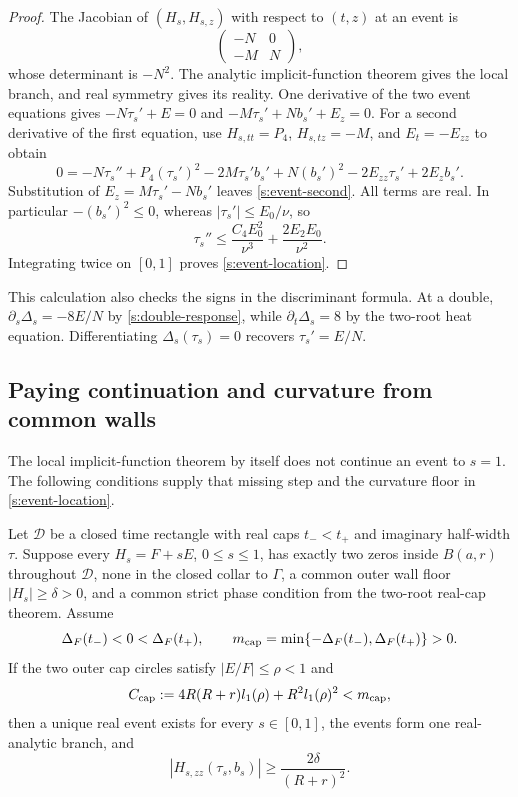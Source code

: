 \begin{proof}
The Jacobian of $(H_s,H_{s,z})$ with respect to $(t,z)$ at an event is
\[
 \begin{pmatrix}-N&0\\-M&N\end{pmatrix},
\]
whose determinant is $-N^2$.  The analytic implicit-function theorem
gives the local branch, and real symmetry gives its reality.  One
derivative of the two event equations gives
$-N\tau_s'+E=0$ and $-M\tau_s'+Nb_s'+E_z=0$.
For a second derivative of the first equation, use
$H_{s,tt}=P_4$, $H_{s,tz}=-M$, and $E_t=-E_{zz}$ to obtain
\[
 0=-N\tau_s''+P_4(\tau_s')^2-2M\tau_s'b_s'
       +N(b_s')^2-2E_{zz}\tau_s'+2E_zb_s'.
\]
Substitution of $E_z=M\tau_s'-Nb_s'$ leaves
\eqref{s:event-second}.  All terms are real.  In particular
$-(b_s')^2\le0$, whereas $|\tau_s'|\le E_0/\nu$, so
\[
 \tau_s''\le\frac{C_4E_0^2}{\nu^3}
                         +\frac{2E_2E_0}{\nu^2}.
\]
Integrating twice on $[0,1]$ proves \eqref{s:event-location}.
\end{proof}

This calculation also checks the signs in the discriminant formula.
At a double, $\partial_s\Delta_s=-8E/N$ by
\eqref{s:double-response}, while $\partial_t\Delta_s=8$ by the
two-root heat equation.  Differentiating
$\Delta_s(\tau_s)=0$ recovers $\tau_s'=E/N$.

\subsection{Paying continuation and curvature from common walls}

The local implicit-function theorem by itself does not continue an
event to $s=1$.  The following conditions supply that missing step and
the curvature floor in \eqref{s:event-location}.

\begin{proposition}
\label{s:continuation}
Let $\mathcal D$ be a closed time rectangle with real caps $t_-<t_+$
and imaginary half-width $\tau$.  Suppose every $H_s=F+sE$,
$0\le s\le1$, has exactly two zeros inside $B(a,r)$ throughout
$\mathcal D$, none in the closed collar to $\Gamma$, a common outer
wall floor $|H_s|\ge\delta>0$, and a common strict phase condition
from the two-root real-cap theorem.  Assume
\[
 \Delta_F(t_-)<0<\Delta_F(t_+),\qquad
 m_{\rm cap}=\min\{-\Delta_F(t_-),\Delta_F(t_+)\}>0.
\]
If the two outer cap circles satisfy $|E/F|\le\rho<1$ and
\begin{equation}
 C_{\rm cap}:=4R(R+r)l_1(\rho)+R^2l_1(\rho)^2<m_{\rm cap},
 \label{s:cap-persistence}
\end{equation}
then a unique real event exists for every $s\in[0,1]$, the events form
one real-analytic branch, and
\begin{equation}
 |H_{s,zz}(\tau_s,b_s)|\ge\frac{2\delta}{(R+r)^2}.
 \label{s:curvature-payment}
\end{equation}
\end{proposition}

